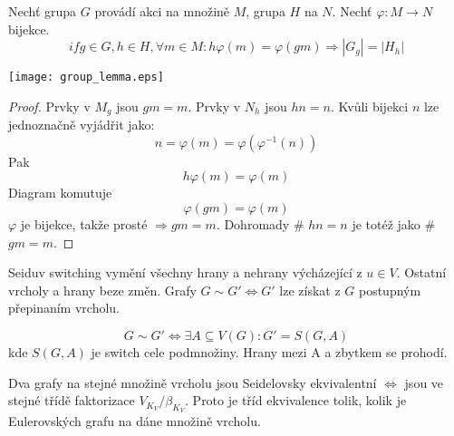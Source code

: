 \begin{theorem}
\end{theorem}

\begin{lemma}
Nechť grupa $G$ provádí akci na množině $M$, grupa $H$ na $N$. Nechť $\varphi:M \to N$ bijekce.
	\[ if g \in G, h \in H, \forall m \in M: h\varphi(m) = \varphi(gm) \Rightarrow |G_{g}| = |H_{h}| \]

	\texttt{[image: group\_lemma.eps]}
\end{lemma}
\begin{proof}
Prvky v $M_g$ jsou $gm = m$. Prvky v $N_h$ jsou $hn = n$. Kvůli bijekci $n$ lze jednoznačně vyjádřit jako:
\[ n = \varphi(m) = \varphi(\varphi^{-1}(n)) \]
Pak
\[ h\varphi(m) = \varphi(m) \]
Diagram komutuje
\[ \varphi(gm) = \varphi(m) \]
$\varphi$ je bijekce, takže prosté $\Rightarrow gm = m$. Dohromady \# $hn = n$ je totéž jako \# $gm = m$.
\end{proof}

\begin{definition}
Seiduv switching vymění všechny hrany a nehrany výcházející z $u \in V$. Ostatní vrcholy a hrany beze změn. Grafy $G \sim G' \iff G'$ lze získat z $G$ postupným přepinaním vrcholu.
\end{definition}

\begin{note}
	\[ G \sim G' \iff \exists A \subseteq V(G): G' = S(G,A) \]
	kde $S(G,A)$ je switch cele podmnožiny. Hrany mezi A a zbytkem se prohodí.
\end{note}

\begin{note}
	Dva grafy na stejné množině vrcholu jsou Seidelovsky ekvivalentní $\iff$ jsou ve stejné třídě faktorizace $V_{K_V}/ \beta_{K_V}$.
	Proto je tříd ekvivalence tolik, kolik je Eulerovských grafu na dáne množině vrcholu.
\end{note}

